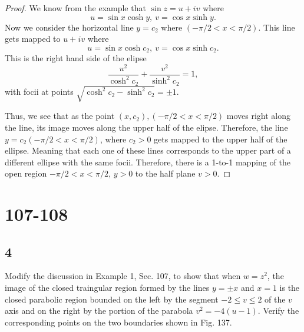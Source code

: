 \documentclass{article}
\begin{document}
\begin{proof}
    We know from the example that $\sin z = u + iv$ where
    \begin{equation*}
        u = \sin x \cosh y, \ v = \cos x \sinh y.
    \end{equation*}
    Now we consider the horizontal line $y = c_2$ where $(-\pi / 2 < x < \pi / 2)$.
    This line gets mapped to $u + iv$ where
    \begin{equation*}
        u = \sin x \cosh c_2, \ v = \cos x \sinh c_2.
    \end{equation*}
    This is the right hand side of the elipse
    \begin{equation*}
        \frac{u^2}{\cosh^2 c_2} + \frac{v^2}{\sinh^2 c_2} = 1,
    \end{equation*}
    with focii at points
    $\sqrt{\cosh^2 c_2 - \sinh^2 c_2} = \pm 1$.

    Thus, we see that as the point $(x, c_2), (-\pi/2 < x < \pi/2)$ moves right
    along the line, its image moves along the upper half of the elipse. Therefore,
    the line $y = c_2 (-\pi / 2 < x < \pi /2)$, where $c_2 > 0$ gets mapped to
    the upper half of the ellipse. Meaning that each one of these lines
    corresponds to the upper part of a different ellipse with the same focii.
    Therefore, there is a 1-to-1 mapping of the open region
    $-\pi/2 < x < \pi/2$, $y> 0$ to the half plane $v>0$.
\end{proof}

\section*{107-108}
\subsection*{4}
Modify the discussion in Example 1, Sec. 107, to show that when $w = z^2$, the
image of the closed traingular region formed by the lines $y = \pm x$ and $x = 1$
is the closed parabolic region bounded on the left by the segment $-2\leq v\leq 2$
of the $v$ axis and on the right by the portion of the parabola
$v^2 = -4(u-1)$. Verify the corresponding points on the two boundaries shown in
Fig. 137.
\end{document}
